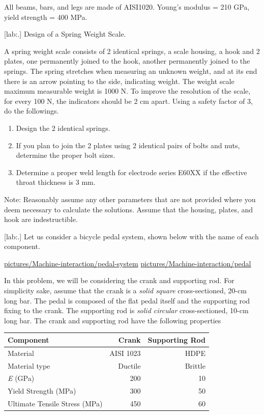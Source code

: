 \documentclass[a4paper,openany,nobib]{tufte-book}
\begin{document}
{{All beams, bars, and legs are made of AISI1020. Young's modulus = 210
GPa, yield strength = 400 MPa.

[lab:.] Design of a Spring Weight
Scale.

A spring weight scale consists of 2 identical springs, a scale housing,
a hook and 2 plates, one permanently joined to the hook, another
permanently joined to the springs. The spring stretches when measuring
an unknown weight, and at its end there is an arrow pointing to the
side, indicating weight. The weight scale maximum measurable weight is
1000 N. To improve the resolution of the scale, for every 100 N, the
indicators should be 2 cm apart. Using a safety factor of 3, do the
followings.

\begin{enumerate}
\item Design the 2 identical springs.

\item If you plan to join the 2 plates using 2 identical pairs of bolts and
nuts, determine the proper bolt sizes.

\item Determine a proper weld length for electrode series E60XX if the
effective throat thickness is 3 mm.
\end{enumerate}

Note: Reasonably assume any other parameters that are not provided where
you deem necessary to calculate the solutions. Assume that the housing,
plates, and hook are indestructible.

[lab:.] Let us consider a bicycle
pedal system, shown below with the name of each component.

\url{pictures/Machine-interaction/pedal-system}
\url{pictures/Machine-interaction/pedal}

In this problem, we will be considering the crank and supporting rod.
For simplicity sake, assume that the crank is a \emph{solid square}
cross-sectioned, 20-cm long bar. The pedal is composed of the flat pedal
itself and the supporting rod fixing to the crank. The supporting rod is
\emph{solid circular} cross-sectioned, 10-cm long bar. The crank and
supporting rod have the following properties

\begin{center}
\begin{tabular}{lrr}
Component & Crank & Supporting Rod\\
\hline
Material & AISI 1023 & HDPE\\
Material type & Ductile & Brittle\\
\emph{E} (GPa) & 200 & 10\\
Yield Strength (MPa) & 300 & 50\\
Ultimate Tensile Stress (MPa) & 450 & 60\\
\end{tabular}
\end{center}

}}
\end{document}
